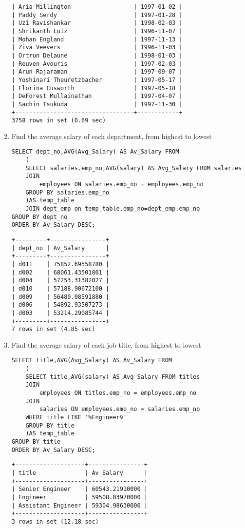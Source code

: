 \documentclass[]{article}
\begin{document}
\begin{enumerate}
\begin{verbatim}
| Aria Millington                  | 1997-01-02 |
| Paddy Serdy                      | 1997-01-28 |
| Uzi Ravishankar                  | 1998-02-03 |
| Shrikanth Luiz                   | 1996-11-07 |
| Mohan England                    | 1997-11-13 |
| Ziva Veevers                     | 1996-11-03 |
| Ortrun Delaune                   | 1998-01-03 |
| Reuven Avouris                   | 1997-02-03 |
| Arun Rajaraman                   | 1997-09-07 |
| Yoshinari Theuretzbacher         | 1997-05-17 |
| Florina Cusworth                 | 1997-05-18 |
| DeForest Mullainathan            | 1997-04-07 |
| Sachin Tsukuda                   | 1997-11-30 |
+----------------------------------+------------+
3758 rows in set (0.69 sec)
\end{verbatim}

\item Find the average salary of each department, from highest to lowest

\begin{verbatim}
SELECT dept_no,AVG(Avg_Salary) AS Av_Salary FROM
	(
	SELECT salaries.emp_no,AVG(salary) AS Avg_Salary FROM salaries
	JOIN 
		employees ON salaries.emp_no = employees.emp_no
	GROUP BY salaries.emp_no
	)AS temp_table 
	JOIN dept_emp on temp_table.emp_no=dept_emp.emp_no
GROUP BY dept_no
ORDER BY Av_Salary DESC;
\end{verbatim}

\begin{verbatim}
+---------+----------------+
| dept_no | Av_Salary      |
+---------+----------------+
| d011    | 75852.69558780 |
| d002    | 68061.43501801 |
| d004    | 57253.31382027 |
| d010    | 57188.90672100 |
| d009    | 56480.08591880 |
| d006    | 54892.93507273 |
| d003    | 53214.29085744 |
+---------+----------------+
7 rows in set (4.85 sec)
\end{verbatim}

\item Find the average salary of each job title, from highest to lowest

\begin{verbatim}
SELECT title,AVG(Avg_Salary) AS Av_Salary FROM
	(
	SELECT title,AVG(salary) AS Avg_Salary FROM titles
	JOIN 
		employees ON titles.emp_no = employees.emp_no
	JOIN
		salaries ON employees.emp_no = salaries.emp_no
	WHERE title LIKE '%Engineer%'
	GROUP BY title
	)AS temp_table
GROUP BY title
ORDER BY Av_Salary DESC;
\end{verbatim}

\begin{verbatim}
+--------------------+----------------+
| title              | Av_Salary      |
+--------------------+----------------+
| Senior Engineer    | 60543.21910000 |
| Engineer           | 59508.03970000 |
| Assistant Engineer | 59304.98630000 |
+--------------------+----------------+
3 rows in set (12.18 sec)
\end{verbatim}

\end{enumerate}
\end{document}
